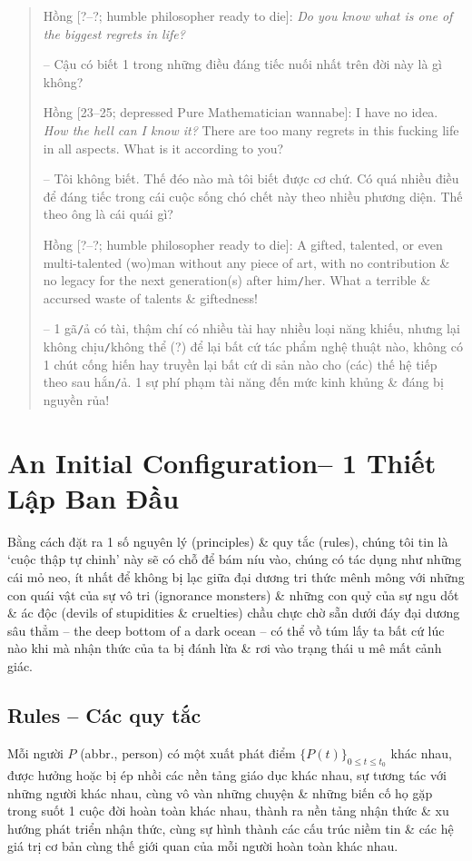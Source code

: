 \documentclass[12pt,twoside]{book}
\begin{document}
\begin{quote}
	{\sf Hồng [?--?; humble philosopher ready to die]}: {\it Do you know what is one of the biggest regrets in life?}
	
	-- Cậu có biết 1 trong những điều đáng tiếc nuối nhất trên đời này là gì không?
	
	{\sf Hồng [23--25; depressed Pure Mathematician wannabe]}: I have no idea. {\it How the hell can I know it?} There are too many regrets in this fucking life in all aspects. What is it according to you?
	
	-- Tôi không biết. Thế đéo nào mà tôi biết được cơ chứ. Có quá nhiều điều để đáng tiếc trong cái cuộc sống chó chết này theo nhiều phương diện. Thế theo ông là cái quái gì?
	
	{\sf Hồng [?--?; humble philosopher ready to die]}: A gifted, talented, or even multi-talented (wo)man without any piece of art, with no contribution \& no legacy for the next generation(s) after him{\tt/}her. What a terrible \& accursed waste of talents \& giftedness!
	
	-- 1 gã{\tt/}ả có tài, thậm chí có nhiều tài hay nhiều loại năng khiếu, nhưng lại không chịu{\tt/}không thể (?) để lại bất cứ tác phẩm nghệ thuật nào, không có 1 chút cống hiến hay truyền lại bất cứ di sản nào cho (các) thế hệ tiếp theo sau hắn{\tt/}ả. 1 sự phí phạm tài năng đến mức kinh khủng \& đáng bị nguyền rủa!
\end{quote}

\chapter{An Initial Configuration-- 1 Thiết Lập Ban Đầu}
\minitoc
Bằng cách đặt ra 1 số nguyên lý (principles) \& quy tắc (rules), chúng tôi tin là `cuộc thập tự chinh' này sẽ có chỗ để bám níu vào, chúng có tác dụng như những cái mỏ neo, ít nhất để không bị lạc giữa đại dương tri thức mênh mông với những con quái vật của sự vô tri (ignorance monsters) \& những con quỷ của sự ngu dốt \& ác độc (devils of stupidities \& cruelties) chầu chực chờ sẵn dưới đáy đại dương sâu thẳm -- the deep bottom of a dark ocean -- có thể vồ túm lấy ta bất cứ lúc nào khi mà nhận thức của ta bị đánh lừa \& rơi vào trạng thái u mê mất cảnh giác.

\section{Rules -- Các quy tắc}
Mỗi người $P$ (abbr., person) có một xuất phát điểm $\{P(t)\}_{0\le t\le t_0}$ khác nhau, được hưởng hoặc bị ép nhồi các nền tảng giáo dục khác nhau, sự tương tác với những người khác nhau, cùng vô vàn những chuyện \& những biến cố họ gặp trong suốt 1 cuộc đời hoàn toàn khác nhau, thành ra nền tảng nhận thức \& xu hướng phát triển nhận thức, cùng sự hình thành các cấu trúc niềm tin \& các hệ giá trị cơ bản cùng thế giới quan của mỗi người hoàn toàn khác nhau.
\end{document}

